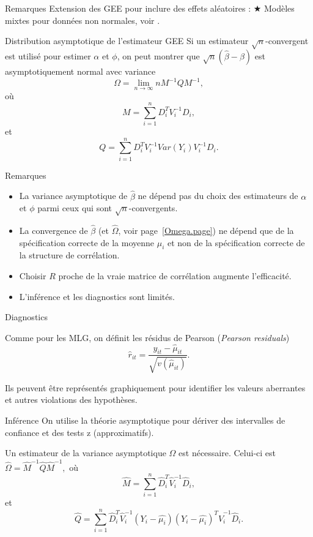 \documentclass{BeamerTemplate}
\begin{document}
\begin{refsection}
\begin{frame}{Remarques}
Extension des GEE pour inclure des effets aléatoires :
{\color{red} $\bigstar$ Modèles mixtes pour données non normales, voir
.}
\end{frame}


\begin{frame}{Distribution asymptotique de l'estimateur GEE}
Si un estimateur $\sqrt{n}$-convergent est utilisé pour estimer $\alpha$ et
$\phi$, on
peut montrer que $\sqrt{n} (\hat{\beta} - \beta)$ est asymptotiquement
normal avec variance
$$ \Omega = \lim_{n \rightarrow \infty} n M^{-1} Q M^{-1},$$
où
$$M = \sum_{i=1}^n D_i^T V_i^{-1} D_i,$$
et
$$Q = \sum_{i=1}^n D_i^T V_i^{-1} Var(Y_i) V_i^{-1} D_i.$$
\end{frame}

\begin{frame}{Remarques}
\begin{itemize}
\item La variance asymptotique de $\hat{\beta}$ ne dépend pas du
  choix des estimateurs de $\alpha$ et $\phi$ parmi ceux
  qui sont $\sqrt{n}$-convergents.
\item La convergence de $\hat{\beta}$ (et $\hat{\Omega}$, voir page~\ref{Omega.page}) ne dépend
que de la spécification correcte
de la moyenne $\mu_i$ et non de la spécification correcte
de la structure de corrélation.
\item Choisir $R$ proche de la vraie matrice de corrélation augmente
  l'efficacité.
\item L'inférence et les diagnostics sont limités.
\end{itemize}
\end{frame}

\begin{frame}{Diagnostics}

Comme pour les MLG, on définit les résidus de Pearson (\textit{Pearson residuals})
$$\hat{r}_{it} = \frac{y_{it} - \hat{\mu}_{it}}{\sqrt{v(\hat{\mu}_{it})}}.$$

\bigskip
Ils peuvent être représentés graphiquement pour identifier les valeurs aberrantes et autres violations des hypothèses.

\end{frame}

\begin{frame}{Inférence}
On utilise la théorie asymptotique pour dériver des intervalles de confiance
et des tests z (approximatifs).

\label{Omega.page}
\bigskip
Un estimateur de la variance asymptotique $\Omega$ est nécessaire. Celui-ci est
$\hat{\Omega} = \hat{M}^{-1} \hat{Q} \hat{M}^{-1},$
où
$$\hat{M} = \sum_{i=1}^n \hat{D}_i^T \hat{V}_i^{-1} \hat{D}_i,$$
et
$$\hat{Q} = \sum_{i=1}^n \hat{D}_i^T \hat{V}_i^{-1} (Y_i - \hat{\mu_i}) (Y_i -
\hat{\mu_i})^T \hat{V}_i^{-1} \hat{D}_i.$$


\end{frame}
\end{refsection}
\end{document}
